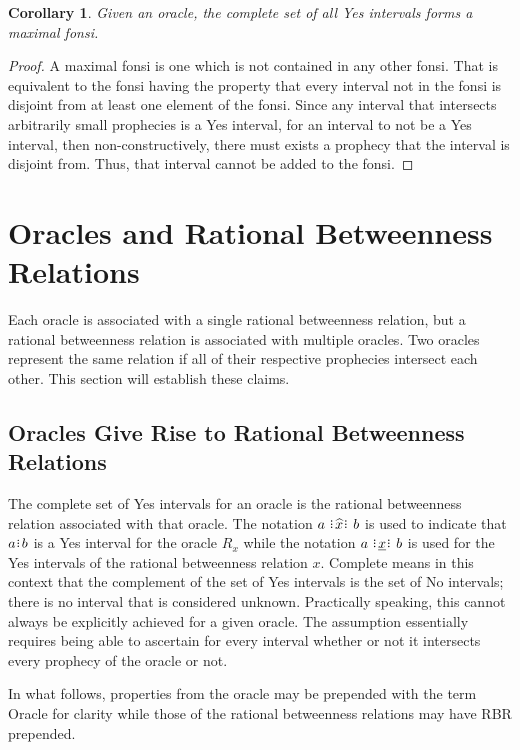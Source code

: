 \documentclass[12pt]{article}
\newtheorem{corollary}{Corollary}[section]
\begin{document}
\begin{corollary}
    Given an oracle, the complete set of all Yes intervals forms a maximal fonsi.
\end{corollary}

\begin{proof}
A maximal fonsi is one which is not contained in any other fonsi. That is equivalent to the fonsi having the property that every interval not in the fonsi is disjoint from at least one element of the fonsi. Since any interval that intersects arbitrarily small prophecies is a Yes interval, for an interval to not be a Yes interval, then non-constructively, there must exists a prophecy that the interval is disjoint from. Thus, that interval cannot be added to the fonsi. 
\end{proof}


\section{Oracles and Rational Betweenness Relations}

Each oracle is associated with a single rational betweenness relation, but a rational betweenness relation is associated with multiple oracles. Two oracles represent the same relation if all of their respective prophecies intersect each other. This section will establish these claims. 

\subsection{Oracles Give Rise to Rational Betweenness Relations}

The complete set of Yes intervals for an oracle is the rational betweenness relation associated with that oracle. The notation $a \xora b$ is used to indicate that $a\rint b$ is a Yes interval for the oracle $R_x$ while the notation $a \xrel b$ is used for the Yes intervals of the rational betweenness relation $x$. Complete means in this context that the complement of the set of Yes intervals is the set of No intervals; there is no interval that is considered unknown. Practically speaking, this cannot always be explicitly achieved for a given oracle. The assumption essentially requires being able to ascertain for every interval whether or not it intersects every prophecy of the oracle or not. 

In what follows, properties from the oracle may be prepended with the term Oracle for clarity while those of the rational betweenness relations may have RBR prepended. 
\end{document}
